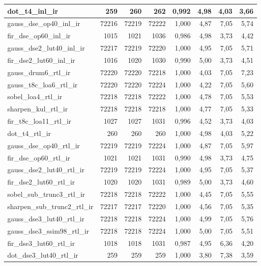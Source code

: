 \begin{table}[htbp]
\begin{tabular}{|l|r|r|r|r|r|r|r|}
dot\_t4\_inl\_ir & 259 & 260 & 262 & 0,992 & 4,98 & 4,03 & 3,66 \\ \hline
gauss\_dse\_op40\_inl\_ir & 72216 & 72219 & 72222 & 1,000 & 4,87 & 7,05 & 5,74 \\ \hline
fir\_dse\_op60\_inl\_ir & 1015 & 1021 & 1036 & 0,986 & 4,98 & 3,73 & 4,42 \\ \hline
gauss\_dse2\_lut40\_inl\_ir & 72217 & 72219 & 72220 & 1,000 & 4,95 & 7,05 & 5,71 \\ \hline
fir\_dse2\_lut60\_inl\_ir & 1016 & 1020 & 1030 & 0,990 & 5,00 & 3,73 & 4,51 \\ \hline
gauss\_drum6\_rtl\_ir & 72220 & 72220 & 72218 & 1,000 & 4,03 & 7,05 & 7,23 \\ \hline
gauss\_t8c\_loa6\_rtl\_ir & 72220 & 72220 & 72224 & 1,000 & 4,22 & 7,05 & 5,60 \\ \hline
sobel\_loa4\_rtl\_ir & 72218 & 72218 & 72222 & 1,000 & 4,78 & 7,05 & 5,53 \\ \hline
sharpen\_kul\_rtl\_ir & 72218 & 72218 & 72218 & 1,000 & 4,77 & 7,05 & 5,33 \\ \hline
fir\_t8c\_loa11\_rtl\_ir & 1027 & 1027 & 1031 & 0,996 & 4,52 & 3,73 & 4,03 \\ \hline
dot\_t4\_rtl\_ir & 260 & 260 & 260 & 1,000 & 4,98 & 4,03 & 5,22 \\ \hline
gauss\_dse\_op40\_rtl\_ir & 72219 & 72219 & 72224 & 1,000 & 4,87 & 7,05 & 5,97 \\ \hline
fir\_dse\_op60\_rtl\_ir & 1021 & 1021 & 1031 & 0,990 & 4,98 & 3,73 & 4,75 \\ \hline
gauss\_dse2\_lut40\_rtl\_ir & 72219 & 72219 & 72224 & 1,000 & 4,95 & 7,05 & 5,37 \\ \hline
fir\_dse2\_lut60\_rtl\_ir & 1020 & 1020 & 1031 & 0,989 & 5,00 & 3,73 & 4,60 \\ \hline
sobel\_sub\_trunc3\_rtl\_ir & 72218 & 72218 & 72222 & 1,000 & 4,45 & 7,05 & 5,55 \\ \hline
sharpen\_sub\_trunc2\_rtl\_ir & 72217 & 72217 & 72220 & 1,000 & 4,56 & 7,05 & 5,35 \\ \hline
gauss\_dse3\_lut40\_rtl\_ir & 72218 & 72218 & 72224 & 1,000 & 4,99 & 7,05 & 5,76 \\ \hline
gauss\_dse3\_ssim98\_rtl\_ir & 72218 & 72218 & 72224 & 1,000 & 5,00 & 7,05 & 5,51 \\ \hline
fir\_dse3\_lut60\_rtl\_ir & 1018 & 1018 & 1031 & 0,987 & 4,95 & 6,36 & 4,20 \\ \hline
dot\_dse3\_lut40\_rtl\_ir & 259 & 259 & 259 & 1,000 & 3,80 & 7,38 & 3,59 \\ \hline
\end{tabular}
\end{table}


